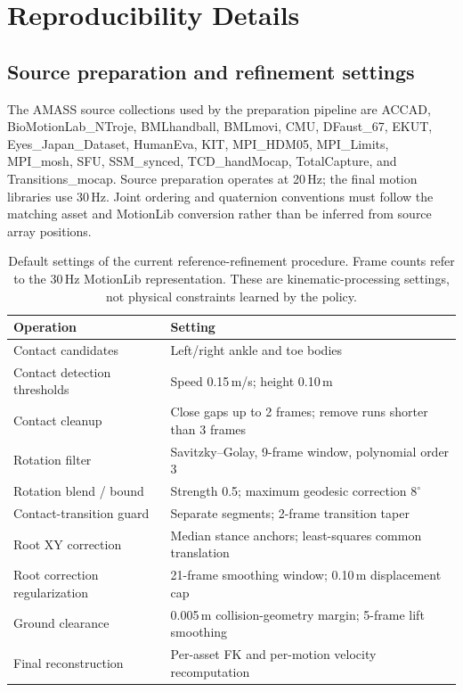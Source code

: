 \documentclass[11pt]{article}
\begin{document}
\appendix
\section{Reproducibility Details}\label{app:reproducibility}

\subsection{Source preparation and refinement settings}\label{app:preprocessing}

The AMASS source collections used by the preparation pipeline are ACCAD,
BioMotionLab\_NTroje, BMLhandball, BMLmovi, CMU, DFaust\_67, EKUT,
Eyes\_Japan\_Dataset, HumanEva, KIT, MPI\_HDM05, MPI\_Limits, MPI\_mosh,
SFU, SSM\_synced, TCD\_handMocap, TotalCapture, and Transitions\_mocap.
Source preparation operates at 20\,Hz; the final motion libraries use
30\,Hz. Joint ordering and quaternion conventions must follow the matching
asset and MotionLib conversion rather than be inferred from source array
positions.

\begin{table}[htbp]
\centering
\small
\caption{Default settings of the current reference-refinement procedure.
Frame counts refer to the 30\,Hz MotionLib representation. These are
kinematic-processing settings, not physical constraints learned by the policy.}\label{tab:refinement_parameters}
\begin{tabularx}{\linewidth}{@{}lY@{}}
\toprule
Operation & Setting \\
\midrule
Contact candidates & Left/right ankle and toe bodies \\
Contact detection thresholds & Speed 0.15\,m/s; height 0.10\,m \\
Contact cleanup & Close gaps up to 2 frames; remove runs shorter than 3 frames \\
Rotation filter & Savitzky--Golay, 9-frame window, polynomial order 3 \\
Rotation blend / bound & Strength 0.5; maximum geodesic correction $8^\circ$ \\
Contact-transition guard & Separate segments; 2-frame transition taper \\
Root XY correction & Median stance anchors; least-squares common translation \\
Root correction regularization & 21-frame smoothing window; 0.10\,m displacement cap \\
Ground clearance & 0.005\,m collision-geometry margin; 5-frame lift smoothing \\
Final reconstruction & Per-asset FK and per-motion velocity recomputation \\
\bottomrule
\end{tabularx}
\end{table}
\end{document}
